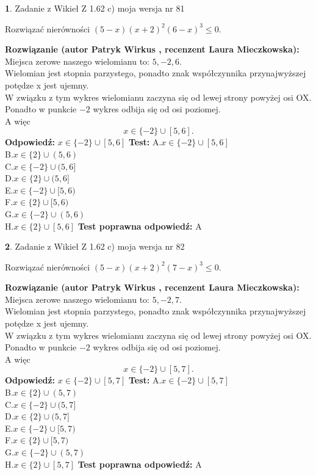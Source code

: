 \documentclass[12pt, a4paper]{article}
\theoremstyle{definition} %
\newtheorem{zad}{}
\newcommand{\zadStart}[1]{\begin{zad}#1\newline}
\newcommand{\zadStop}{\end{zad}}
\newcommand{\rozwStart}[2]{\noindent \textbf{Rozwiązanie (autor #1 , recenzent #2): }\newline}
\newcommand{\rozwStop}{\newline}
\newcommand{\odpStart}{\noindent \textbf{Odpowiedź:}\newline}
\newcommand{\odpStop}{\newline}
\newcommand{\testStart}{\noindent \textbf{Test:}\newline}
\newcommand{\testStop}{\newline}
\newcommand{\kluczStart}{\noindent \textbf{Test poprawna odpowiedź:}\newline}
\newcommand{\kluczStop}{\newline}
\begin{document}
\zadStart{Zadanie z Wikieł Z 1.62 c) moja wersja nr 81}

Rozwiązać nierówności $(5-x)(x+2)^{2}(6-x)^{3}\le0$.
\zadStop
\rozwStart{Patryk Wirkus}{Laura Mieczkowska}
Miejsca zerowe naszego wielomianu to: $5, -2, 6$.\\
Wielomian jest stopnia parzystego, ponadto znak współczynnika przy\linebreak najwyższej potędze x jest ujemny.\\ W związku z tym wykres wielomianu zaczyna się od lewej strony powyżej osi OX.\\
Ponadto w punkcie $-2$ wykres odbija się od osi poziomej.\\
A więc $$x \in \{-2\} \cup [5,6].$$
\rozwStop
\odpStart
$x \in \{-2\} \cup [5,6]$
\odpStop
\testStart
A.$x \in \{-2\} \cup [5,6]$\\
B.$x \in \{2\} \cup (5,6)$\\
C.$x \in \{-2\} \cup (5,6]$\\
D.$x \in \{2\} \cup (5,6]$\\
E.$x \in \{-2\} \cup [5,6)$\\
F.$x \in \{2\} \cup [5,6)$\\
G.$x \in \{-2\} \cup (5,6)$\\
H.$x \in \{2\} \cup [5,6]$
\testStop
\kluczStart
A
\kluczStop



\zadStart{Zadanie z Wikieł Z 1.62 c) moja wersja nr 82}

Rozwiązać nierówności $(5-x)(x+2)^{2}(7-x)^{3}\le0$.
\zadStop
\rozwStart{Patryk Wirkus}{Laura Mieczkowska}
Miejsca zerowe naszego wielomianu to: $5, -2, 7$.\\
Wielomian jest stopnia parzystego, ponadto znak współczynnika przy\linebreak najwyższej potędze x jest ujemny.\\ W związku z tym wykres wielomianu zaczyna się od lewej strony powyżej osi OX.\\
Ponadto w punkcie $-2$ wykres odbija się od osi poziomej.\\
A więc $$x \in \{-2\} \cup [5,7].$$
\rozwStop
\odpStart
$x \in \{-2\} \cup [5,7]$
\odpStop
\testStart
A.$x \in \{-2\} \cup [5,7]$\\
B.$x \in \{2\} \cup (5,7)$\\
C.$x \in \{-2\} \cup (5,7]$\\
D.$x \in \{2\} \cup (5,7]$\\
E.$x \in \{-2\} \cup [5,7)$\\
F.$x \in \{2\} \cup [5,7)$\\
G.$x \in \{-2\} \cup (5,7)$\\
H.$x \in \{2\} \cup [5,7]$
\testStop
\kluczStart
A
\kluczStop
\end{document}
